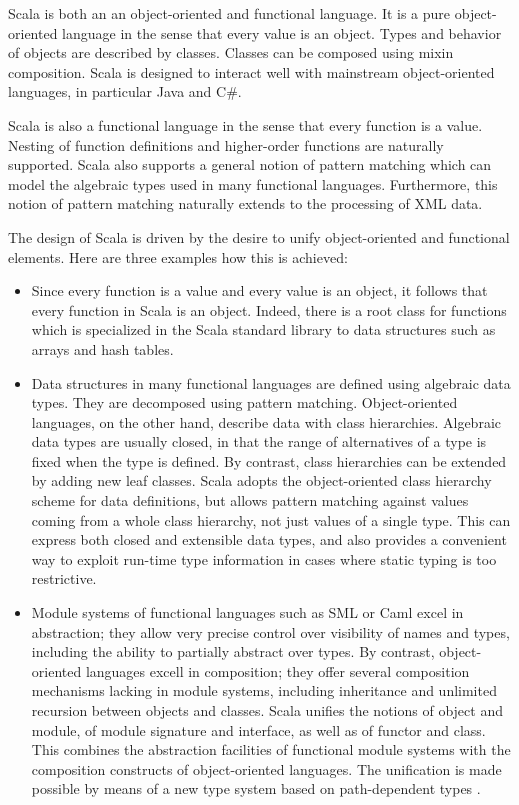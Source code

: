 Scala is both an an object-oriented and functional language.  It is a
pure object-oriented language in the sense that every value is an
object. Types and behavior of objects are described by
classes. Classes can be composed using mixin composition.  Scala is
designed to interact well with mainstream object-oriented languages,
in particular Java and C\#.

Scala is also a functional language in the sense that every function
is a value. Nesting of function definitions and higher-order functions
are naturally supported. Scala also supports a general notion of
pattern matching which can model the algebraic types used in many
functional languages. Furthermore, this notion of pattern matching
naturally extends to the processing of XML data.

The design of Scala is driven by the desire to unify object-oriented
and functional elements. Here are three examples how this is achieved:
\begin{itemize}
\item
Since every function is a value and every value is an object, it
follows that every function in Scala is an object. Indeed, there is a
root class for functions which is specialized in the Scala standard
library to data structures such as arrays and hash tables.
\item
Data structures in many functional languages are defined using
algebraic data types. They are decomposed using pattern matching.
Object-oriented languages, on the other hand, describe data with class
hierarchies. Algebraic data types are usually closed, in that the
range of alternatives of a type is fixed when the type is defined.  By
contrast, class hierarchies can be extended by adding new leaf
classes.  Scala adopts the object-oriented class hierarchy scheme for
data definitions, but allows pattern matching against values coming
from a whole class hierarchy, not just values of a single type.
This can express both closed and extensible data types, and also
provides a convenient way to exploit run-time type information in
cases where static typing is too restrictive.
\item
Module systems of functional languages such as SML or Caml excel in
abstraction; they allow very precise control over visibility of names
and types, including the ability to partially abstract over types.  By
contrast, object-oriented languages excell in composition; they offer
several composition mechanisms lacking in module systems, including
inheritance and unlimited recursion between objects and classes.
Scala unifies the notions of object and module, of module signature
and interface, as well as of functor and class. This combines the
abstraction facilities of functional module systems with the
composition constructs of object-oriented languages. The unification
is made possible by means of a new type system based on path-dependent
types \cite{odersky-et-al:fool10}.
\end{itemize}

